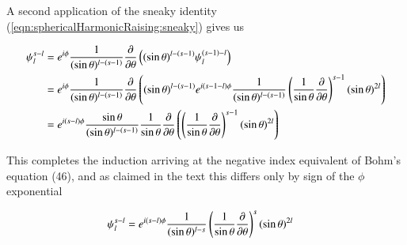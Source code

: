 A second application of the sneaky identity (\ref{eqn:sphericalHarmonicRaising:sneaky}) gives us

\begin{align*}
\psi_l^{s-l} 
&=
e^{i\phi} \frac{1}{(\sin\theta)^{l-(s-1)}} \frac{\partial {}}{\partial {\theta}} \left( (\sin\theta)^{l-(s-1)} \psi_l^{(s-1)-l} \right) \\
&=
e^{i\phi} \frac{1}{(\sin\theta)^{l-(s-1)}} \frac{\partial {}}{\partial {\theta}} \left( (\sin\theta)^{l-(s-1)} 
e^{i(s-1-l)\phi} \frac{1}{(\sin\theta)^{l-(s-1)}} \left( \frac{1}{\sin\theta}\frac{\partial {}}{\partial {\theta}} \right)^{s-1} (\sin\theta)^{2l} 
\right) \\
&=
e^{i(s-l)\phi}
\frac{\sin\theta}{(\sin\theta)^{l-(s-1)}} \frac{1}{\sin\theta} \frac{\partial {}}{\partial {\theta}} \left( 
\left( \frac{1}{\sin\theta}\frac{\partial {}}{\partial {\theta}} \right)^{s-1} (\sin\theta)^{2l} 
\right) \\
\end{align*}

This completes the induction arriving at the negative index equivalent of Bohm's equation (46), and as claimed in the text this differs only by sign of the $\phi$ exponential

\begin{align}\label{eqn:sphericalHarmonicRaising:sminusL}
\psi_l^{s-l} 
&=
e^{i(s-l)\phi} \frac{1}{(\sin\theta)^{l-s}} \left( \frac{1}{\sin\theta}\frac{\partial {}}{\partial {\theta}} \right)^s (\sin\theta)^{2l} 
\end{align}

\EndArticle
